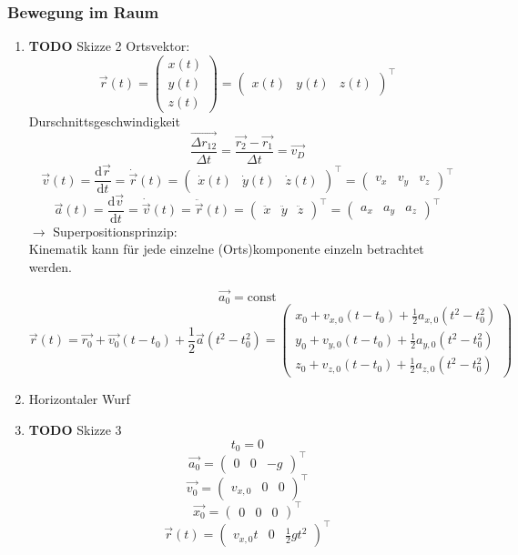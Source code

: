 \documentclass[11pt]{article}
\begin{document}
\subsubsection{Bewegung im Raum}
\label{sec-7-1-2}
\begin{enumerate}
\item {\bfseries\sffamily TODO} Skizze 2
\label{sec-7-1-2-1}
Ortsvektor:
\[\vec{r}(t) = \begin{pmatrix} x(t) \\ y(t) \\ z(t) \end{pmatrix} = {\begin{pmatrix} x(t) & y(t) & z(t)\end{pmatrix}}^\intercal\]
Durschnittsgeschwindigkeit
\[\frac{\vec{\Delta r_{12}}}{\Delta t} = \frac{\vec{r_2} - \vec{r_1}}{\Delta t} = \vec{v_D}\]
\[\vec{v}(t) = \frac{\mathrm{d}\vec{r}}{\mathrm{d}t} = \dot{\vec{r}}(t) = {\begin{pmatrix}\dot{x}(t) & \dot{y}(t) & \dot{z}(t)\end{pmatrix}}^\intercal = {\begin{pmatrix} v_x & v_y & v_z\end{pmatrix}}^\intercal\]
\[\vec{a}(t) = \frac{\mathrm{d}\vec{v}}{\mathrm{d}t} = \dot{\vec{v}}(t) = \ddot{\vec{r}}(t) = {\begin{pmatrix} \ddot{x} & \ddot{y} & \ddot{z}\end{pmatrix}}^\intercal = {\begin{pmatrix} a_x & a_y & a_z \end{pmatrix}}^\intercal\]
$\rightarrow$ Superpositionsprinzip: \\
    Kinematik kann für jede einzelne (Orts)komponente einzeln betrachtet werden.

\[\vec{a_0} = \text{const}\]
\[\vec{r}(t) = \vec{r_0} + \vec{v_0}(t-t_0) + \frac{1}{2}\vec{a}(t^2-t_0^2) = \begin{pmatrix} x_0 + v_{x,0}(t-t_0) + \frac{1}{2} a_{x,0}(t^2-t_0^2) \\ y_0 + v_{y,0}(t-t_0) + \frac{1}{2} a_{y,0}(t^2-t_0^2) \\ z_0 + v_{z,0}(t-t_0) + \frac{1}{2} a_{z,0}(t^2-t_0^2) \end{pmatrix}\]
\item Horizontaler Wurf
\label{sec-7-1-2-2}
\item {\bfseries\sffamily TODO} Skizze 3
\label{sec-7-1-2-3}
\[t_0 = 0\]
\[\vec{a_0} =  {\begin{pmatrix} 0 & 0 & -g \end{pmatrix}}^\intercal\]
\[\vec{v_0} =  {\begin{pmatrix} v_{x,0} & 0 & 0 \end{pmatrix}}^\intercal\]
\[\vec{x_0} =  {\begin{pmatrix} 0 & 0 & 0 \end{pmatrix}}^\intercal\]
\[\vec{r}(t) =  {\begin{pmatrix} v_{x,0}t & 0 & \frac{1}{2}gt^2 \end{pmatrix}}^\intercal\]


\end{enumerate}
\end{document}
